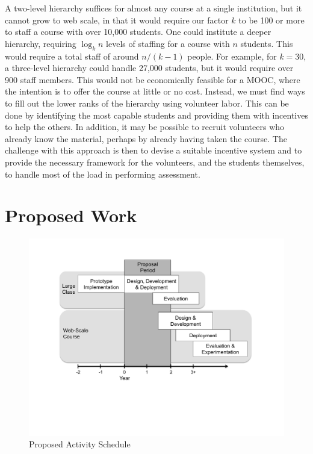 \documentclass[12pt]{article}
\begin{document}
A two-level hierarchy suffices for almost any course at a single
institution, but it cannot grow to web scale, in that it would require
our factor $k$ to be 100 or more to staff a course with over 10,000
students.  One could institute a deeper hierarchy,
requiring $\log_k n$ levels of staffing for a course with $n$ students.
This would require a
total staff of around $n/(k-1)$ people.  For example, for $k = 30$, a
three-level hierarchy could handle 27,000 students, but it would
require over 900 staff members.  This would not be economically feasible
for a MOOC, where the intention is to offer the course at little or no
cost.  Instead, we must find ways to fill out the lower ranks of the
hierarchy using volunteer labor.  This can be done by identifying the
most capable students and providing them with incentives to help the
others.  In addition, it may be possible to recruit volunteers who
already know the material, perhaps by already having taken the course.
The challenge with this approach is then to devise a suitable
incentive system and to provide the necessary framework for the
volunteers, and the students themselves, to handle most of the load in
performing assessment.

\section{Proposed Work}

\begin{figure}
\begin{center}
\includegraphics[scale=0.5]{schedule}
\end{center}
\caption{Proposed Activity Schedule}
\label{fig:schedule}
\end{figure}
\end{document}
